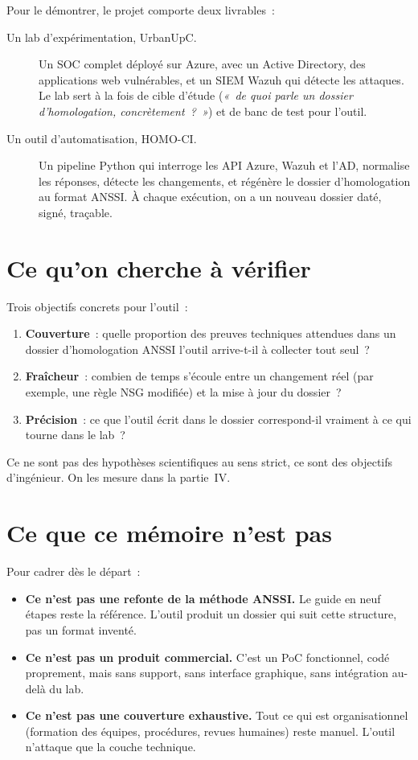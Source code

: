 Pour le démontrer, le projet comporte deux livrables~:

\begin{description}
  \item[Un lab d'expérimentation, UrbanUpC.] Un SOC complet déployé
    sur Azure, avec un Active Directory, des applications web
    vulnérables, et un SIEM Wazuh qui détecte les attaques. Le
    lab sert à la fois de cible d'étude (\emph{«~de quoi parle
    un dossier d'homologation, concrètement~?~»}) et de banc de
    test pour l'outil.
  \item[Un outil d'automatisation, HOMO-CI.] Un pipeline Python
    qui interroge les API Azure, Wazuh et l'AD, normalise les
    réponses, détecte les changements, et régénère le dossier
    d'homologation au format ANSSI. À chaque exécution, on a un
    nouveau dossier daté, signé, traçable.
\end{description}

\section{Ce qu'on cherche à vérifier}

Trois objectifs concrets pour l'outil~:

\begin{enumerate}
  \item \textbf{Couverture}~: quelle proportion des preuves
    techniques attendues dans un dossier d'homologation ANSSI
    l'outil arrive-t-il à collecter tout seul~?
  \item \textbf{Fraîcheur}~: combien de temps s'écoule entre un
    changement réel (par exemple, une règle NSG modifiée) et la
    mise à jour du dossier~?
  \item \textbf{Précision}~: ce que l'outil écrit dans le
    dossier correspond-il vraiment à ce qui tourne dans le lab~?
\end{enumerate}

Ce ne sont pas des hypothèses scientifiques au sens strict, ce sont
des objectifs d'ingénieur. On les mesure dans la partie~IV.

\section{Ce que ce mémoire n'est pas}

Pour cadrer dès le départ~:

\begin{itemize}
  \item \textbf{Ce n'est pas une refonte de la méthode ANSSI.}
    Le guide en neuf étapes reste la référence. L'outil produit
    un dossier qui suit cette structure, pas un format inventé.
  \item \textbf{Ce n'est pas un produit commercial.} C'est un PoC
    fonctionnel, codé proprement, mais sans support, sans
    interface graphique, sans intégration au-delà du lab.
  \item \textbf{Ce n'est pas une couverture exhaustive.} Tout ce
    qui est organisationnel (formation des équipes, procédures,
    revues humaines) reste manuel. L'outil n'attaque que la
    couche technique.
\end{itemize}

